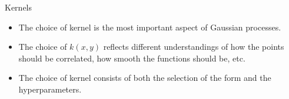 \documentclass[10pt]{beamer}
\begin{document}

\begin{frame}{Kernels}
  \begin{itemize}
  \item The choice of kernel is the most important aspect of Gaussian processes. 
  \item The choice of $k(x,y)$ reflects different understandings of how the points should be correlated, how smooth the functions should be, etc. 
  \item The choice of kernel consists of both the selection of the form and the hyperparameters. 
  \end{itemize}
  \begin{center}
  \end{center}
\end{frame}
\end{document}
